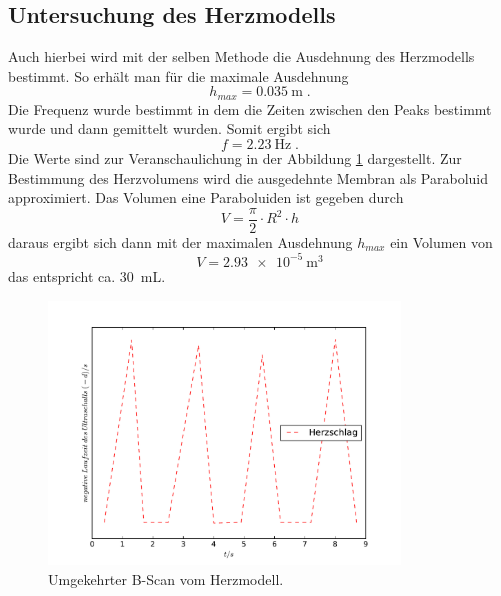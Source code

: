 \subsection{Untersuchung des Herzmodells}
Auch hierbei wird mit der selben Methode die Ausdehnung des Herzmodells
bestimmt. So erhält man für die maximale Ausdehnung
\begin{equation*}
  h_{max} = \SI{0.035}{\meter} \; .
\end{equation*}
Die Frequenz wurde bestimmt in dem die Zeiten zwischen den Peaks bestimmt wurde
und dann gemittelt wurden. Somit ergibt sich
\begin{equation*}
  f = \SI{2.23}{\hertz}\;.
\end{equation*}
Die Werte sind zur Veranschaulichung in der Abbildung \ref{fig:Hp} dargestellt.
Zur Bestimmung des Herzvolumens wird die ausgedehnte Membran als Paraboluid
approximiert. Das Volumen eine Paraboluiden ist gegeben durch
\begin{equation*}
  V = \frac{\pi}{2} \cdot R^2 \cdot h
\end{equation*}
daraus ergibt sich dann mit der maximalen Ausdehnung $h_{max}$ ein Volumen von
\begin{equation*}
  V = \SI{2.93e-5}{\cubic\meter}
\end{equation*}
das entspricht ca. \SI{30}{\milli\liter}.
\begin{figure}
  \centering
  \includegraphics[height=7cm]{plots/Herzplot.pdf}
  \caption{Umgekehrter B-Scan vom Herzmodell.}
  \label{fig:Hp}
\end{figure}






















%
